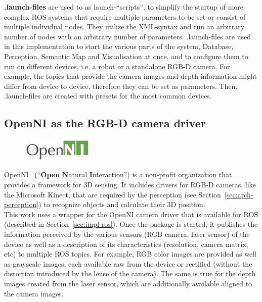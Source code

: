 \textbf{.launch-files} are used to as launch-``scripts'', to simplify the startup of more complex ROS systems that require multiple parameters to be set or consist of multiple individual nodes. They utilize the XML-syntax and run an arbitrary number of nodes with an arbitrary number of parameters. .launch-files are used in this implementation to start the various parts of the system, Database, Perception, Semantic Map and Visualisation at once, and to configure them to run on different devices, i.e. a robot or a standalone RGB-D camera. For example, the topics that provide the camera images and depth information might differ from device to device, therefore they can be set as parameters. Then, .launch-files are created with presets for the most common devices.

\subsection{OpenNI as the RGB-D camera driver}
\label{sec:impl-openni}
\begin{figure}
  \vspace{-10pt}
  \centering
  \includegraphics[width=0.31\textwidth]{images/Logo_OpenNI.png}
  \vspace{-15pt}
\end{figure}

OpenNI~\cite{openni_sdk} (``\textbf{Open} \textbf{N}atural \textbf{I}nteraction'') is a non-profit organization that provides a framework for 3D sensing. It includes drivers for RGB-D cameras, like the Microsoft Kinect, that are required by the perception (see Section~\ref{sec:arch-perception}) to recognize objects and calculate their 3D position. \\

This work uses a wrapper for the OpenNI camera driver that is available for ROS (described in Section~\ref{sec:impl-ros}). Once the package is started, it publishes the information perceived by the various sensors (RGB camera, laser sensor) of the device as well as a description of its characteristics (resolution, camera matrix, etc) to multiple ROS topics. For example, RGB color images are provided as well as grayscale images, each available raw from the device or rectified (without the distortion introduced by the lense of the camera). The same is true for the depth images created from the laser sensor, which are additionally available aligned to the camera images.

